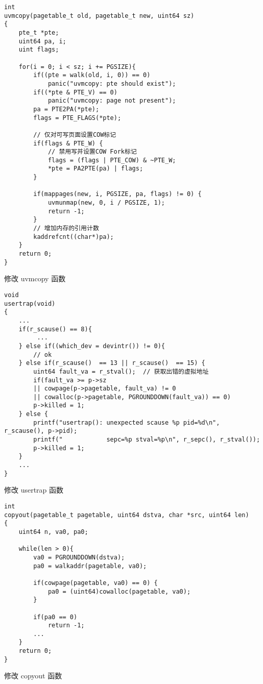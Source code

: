 \begin{listing}[!htb]
	\begin{verbatim}
int
uvmcopy(pagetable_t old, pagetable_t new, uint64 sz)
{
    pte_t *pte;
    uint64 pa, i;
    uint flags;

    for(i = 0; i < sz; i += PGSIZE){
        if((pte = walk(old, i, 0)) == 0)
            panic("uvmcopy: pte should exist");
        if((*pte & PTE_V) == 0)
            panic("uvmcopy: page not present");
        pa = PTE2PA(*pte);
        flags = PTE_FLAGS(*pte);

        // 仅对可写页面设置COW标记
        if(flags & PTE_W) {
            // 禁用写并设置COW Fork标记
            flags = (flags | PTE_COW) & ~PTE_W;
            *pte = PA2PTE(pa) | flags;
        }

        if(mappages(new, i, PGSIZE, pa, flags) != 0) {
            uvmunmap(new, 0, i / PGSIZE, 1);
            return -1;
        }
        // 增加内存的引用计数
        kaddrefcnt((char*)pa);
    }
    return 0;
}
	\end{verbatim}
	\caption{修改 uvmcopy 函数}\label{lst:change_uvmcopy}
\end{listing}

\begin{listing}[!htb]
	\begin{verbatim}
void
usertrap(void)
{
    ...
    if(r_scause() == 8){
         ...
    } else if((which_dev = devintr()) != 0){
        // ok
    } else if(r_scause()  == 13 || r_scause()  == 15) {
        uint64 fault_va = r_stval();  // 获取出错的虚拟地址
        if(fault_va >= p->sz
        || cowpage(p->pagetable, fault_va) != 0
        || cowalloc(p->pagetable, PGROUNDDOWN(fault_va)) == 0)
        p->killed = 1;
    } else {
        printf("usertrap(): unexpected scause %p pid=%d\n", r_scause(), p->pid);
        printf("            sepc=%p stval=%p\n", r_sepc(), r_stval());
        p->killed = 1;
    }
    ...
}
	\end{verbatim}
	\caption{修改 usertrap 函数}\label{lst:change_usertrap}
\end{listing}

\begin{listing}[!htb]
	\begin{verbatim}
int
copyout(pagetable_t pagetable, uint64 dstva, char *src, uint64 len)
{
    uint64 n, va0, pa0;
    
    while(len > 0){
        va0 = PGROUNDDOWN(dstva);
        pa0 = walkaddr(pagetable, va0);
        
        if(cowpage(pagetable, va0) == 0) {
            pa0 = (uint64)cowalloc(pagetable, va0);
        }

        if(pa0 == 0)
            return -1;
        ...
    }
    return 0;
}
	\end{verbatim}
	\caption{修改 copyout 函数}\label{lst:change_copyout}
\end{listing}

